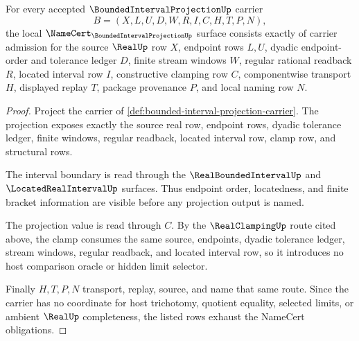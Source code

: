 \begin{theorem}
\label{thm:bounded-interval-projection-namecert-obligations}
For every accepted $\BoundedIntervalProjectionUp$ carrier
$$
B=(X,L,U,D,W,R,I,C,H,T,P,N),
$$
the local $\NameCert_{\BoundedIntervalProjectionUp}$ surface consists exactly of carrier admission for the source $\RealUp$ row $X$, endpoint rows $L,U$, dyadic endpoint-order and tolerance ledger $D$, finite stream windows $W$, regular rational readback $R$, located interval row $I$, constructive clamping row $C$, componentwise transport $H$, displayed replay $T$, package provenance $P$, and local naming row $N$.
\end{theorem}
\begin{proof}
Project the carrier of \autoref{def:bounded-interval-projection-carrier}. The projection exposes exactly the source real row, endpoint rows, dyadic tolerance ledger, finite windows, regular readback, located interval row, clamp row, and structural rows.

The interval boundary is read through the $\RealBoundedIntervalUp$ and $\LocatedRealIntervalUp$ surfaces. Thus endpoint order, locatedness, and finite bracket information are visible before any projection output is named.

The projection value is read through $C$. By the $\RealClampingUp$ route cited above, the clamp consumes the same source, endpoints, dyadic tolerance ledger, stream windows, regular readback, and located interval row, so it introduces no host comparison oracle or hidden limit selector.

Finally $H,T,P,N$ transport, replay, source, and name that same route. Since the carrier has no coordinate for host trichotomy, quotient equality, selected limits, or ambient $\RealUp$ completeness, the listed rows exhaust the NameCert obligations.
\end{proof}

